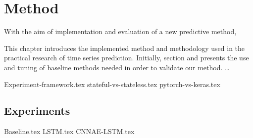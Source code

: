 \chapter{Method}
\label{section:Method}

With the aim of implementation and evaluation of a new predictive method,

This chapter introduces the implemented method and methodology used in the practical research of time series prediction.
Initially, section  and  presents the use and tuning of baseline methods needed in order to validate our method.
\dots

{Experiment-framework.tex}
{stateful-vs-stateless.tex}
{pytorch-vs-keras.tex}

\section{Experiments}
{Baseline.tex}
{LSTM.tex}
{CNNAE-LSTM.tex}
